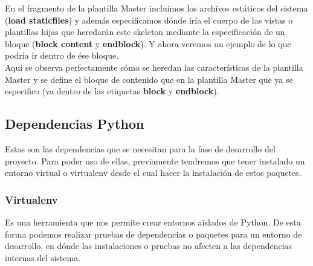 

\newpage
\begin{minipage}{\linewidth}
  En el fragmento de la plantilla Master incluimos los archivos estáticos del sistema (\textbf{load staticfiles}) y además especificamos dónde iría el cuerpo de las vistas o plantillas hijas que heredarán este skeleton mediante la especificación de un bloque (\textbf{block content} y \textbf{endblock}). Y ahora veremos un ejemplo de lo que podría ir dentro de ése bloque.\\
  
  Aquí se observa perfectamente cómo se heredan las características de la plantilla Master y se define el bloque de contenido que en la plantilla Master que ya se especifico (va dentro de las etiquetas \textbf{block} y \textbf{endblock}). \\
\end{minipage}

\subsection{Dependencias Python}

Estas son las dependencias que se necesitan para la fase de desarrollo del proyecto. Para poder uso de ellas, previamente tendremos que tener instalado un entorno virtual o virtualenv desde el cual hacer la instalación de estos paquetes.

\subsubsection{Virtualenv}

Es una herramienta que nos permite crear entornos aislados de Python. De esta forma podemos realizar pruebas de dependencias o paquetes para un entorno de desarrollo, en dónde las instalaciones o pruebas no afecten a las dependencias internas del sistema.\\

